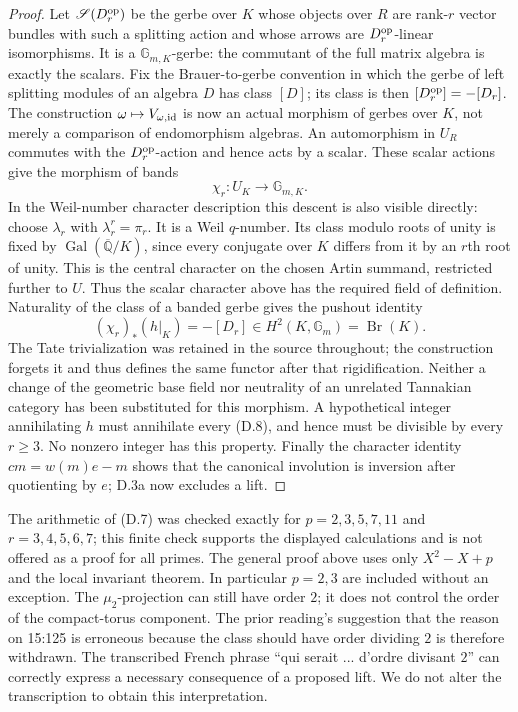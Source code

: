 \begin{proof}
Let $\mathscr S(D_r^{\rm op})$ be the gerbe over $K$ whose objects over $R$ are
rank-$r$ vector bundles with such a splitting action and whose arrows
are $D_r^{\rm op}$-linear isomorphisms. It is a $\mathbb G_{m,K}$-gerbe:
the commutant of the full matrix algebra is exactly the scalars.
Fix the Brauer-to-gerbe convention in which the gerbe of left
splitting modules of an algebra $D$ has class $[D]$; its class is
then $[D_r^{\rm op}]=-[D_r]$. The construction
$\omega\mapsto V_{\omega,{\rm id}}$ is now an actual morphism of
gerbes over $K$, not merely a comparison of endomorphism algebras.
An automorphism in $U_R$ commutes with the $D_r^{\rm op}$-action and hence
acts by a scalar. These scalar actions give the morphism of bands
\[
 \chi_r:U_K\longrightarrow\mathbb G_{m,K}.
\]
In the Weil-number character description this descent is also visible
directly: choose $\lambda_r$ with $\lambda_r^r=\pi_r$. It is a Weil
$q$-number. Its class modulo roots of unity is fixed by
$\operatorname{Gal}(\overline{\mathbb Q}/K)$, since every conjugate over
$K$ differs from it by an $r$th root of unity. This is the central
character on the chosen Artin summand, restricted further to $U$.
Thus the scalar character above has the required field of definition.
Naturality of the class of a banded gerbe gives the pushout identity
\[
 (\chi_r)_*(h|_K)=-[D_r]\in H^2(K,\mathbb G_m)=\operatorname{Br}(K).
 \tag{D.8}
\]
The Tate trivialization was retained in the source throughout; the
construction forgets it and thus defines the same functor after that
rigidification. Neither a change of the geometric base field nor
neutrality of an unrelated Tannakian category has been substituted
for this morphism. A hypothetical integer annihilating $h$ must
annihilate every (D.8), and hence must be divisible by every $r\geq3$.
No nonzero integer has this property. Finally the character identity
$cm=w(m)e-m$ shows that the canonical involution is inversion after
quotienting by $e$; D.3a now excludes a lift.
\end{proof}

The arithmetic of (D.7) was checked exactly for $p=2,3,5,7,11$ and
$r=3,4,5,6,7$; this finite check supports the displayed calculations and
is not offered as a proof for all primes. The general proof above uses
only $X^2-X+p$ and the local invariant theorem. In particular $p=2,3$
are included without an exception. The $\mu _2$-projection can still have
order $2$; it does not control the order of the compact-torus component.
The prior reading's suggestion that the reason on 15:125 is erroneous
because the class should have order dividing $2$ is therefore withdrawn.
The transcribed French phrase ``qui serait ... d'ordre divisant $2$'' can
correctly express a necessary consequence of a proposed lift. We do not
alter the transcription to obtain this interpretation.

